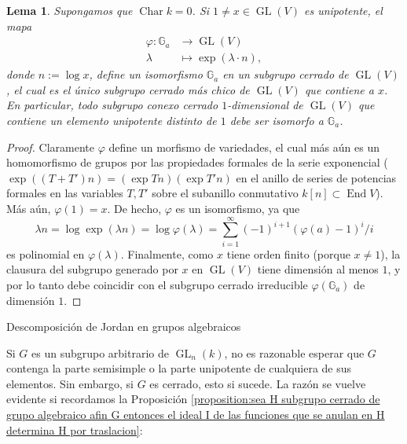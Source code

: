 \documentclass[spanish,10pt]{amsart}
\makeatletter
\renewcommand\subsection{\@startsection{subsection}{2}%
  \z@{.5\linespacing\@plus.7\linespacing}{-.5em}%
  {\normalfont\sffamily}}
\newtheorem{lemma}[theorem]{Lema}
\theoremstyle{definition}
\theoremstyle{remark}
\numberwithin{equation}{section}
\newcommand{\Char}[1]{\operatorname{Char} #1}
\makeatother
\begin{document}
\begin{lemma}
Supongamos que $\Char k = 0$. Si $1 \neq x \in \operatorname{GL} (V)$ es unipotente, el mapa
\begin{align*}
\varphi : \mathbb{G}_a &\longrightarrow \operatorname{GL} (V) \\
\lambda &\longmapsto \exp (\lambda \cdot n),
\end{align*}
donde $n := \log x$, define un isomorfismo $ \mathbb{G}_a$ en un subgrupo cerrado de $\operatorname{GL} (V)$, el cual es el único subgrupo cerrado más chico de $\operatorname{GL}(V)$ que contiene a $x$. En particular, todo subgrupo conexo cerrado $1$-dimensional de $\operatorname{GL} (V)$ que contiene un elemento unipotente distinto de $1$ debe ser isomorfo a $\mathbb{G}_a$.
\end{lemma}
\begin{proof}
Claramente $\varphi$ define un morfismo de variedades, el cual más aún es un homomorfismo de grupos por las propiedades formales de la serie exponencial ($\exp ((T+T')n) = (\exp T n) (\exp T' n)$ en el anillo de series de potencias formales en las variables $T,T'$ sobre el subanillo conmutativo $k[n] \subset \operatorname{End} V$). Más aún, $\varphi (1) = x$. De hecho, $\varphi$ es un isomorfismo, ya que
\[
    \lambda n = \log \exp (\lambda n) = \log \varphi (\lambda) = \sum_{i = 1}^\infty (-1)^{i+1} (\varphi (a)- 1)^i / i
\]
es polinomial en $\varphi (\lambda)$. Finalmente, como $x$ tiene orden finito (porque $x \neq 1$), la clausura del subgrupo generado por $x$ en $\operatorname{GL} (V)$ tiene dimensión al menos $1$, y por lo tanto debe coincidir con el subgrupo cerrado irreducible $\varphi (\mathbb{G}_a)$ de dimensión $1$.
\end{proof}



\subsection{Descomposición de Jordan en grupos algebraicos}

Si $G$ es un subgrupo arbitrario de $\operatorname{GL}_n (k)$, no es razonable esperar que $G$ contenga la parte semisimple o la parte unipotente de cualquiera de sus elementos. Sin embargo, si $G$ es cerrado, esto si sucede. La razón se vuelve evidente si recordamos la Proposición \ref{proposition:sea H subgrupo cerrado de grupo algebraico afin G entonces el ideal I de las funciones que se anulan en H determina H por traslacion}:
\end{document}
